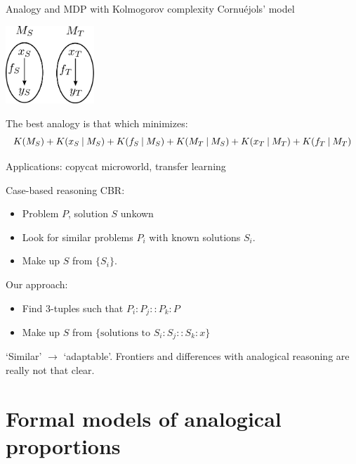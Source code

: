 \documentclass{beamer}
\begin{document}
\begin{frame}{Analogy and MDP with Kolmogorov complexity}
  Cornuéjols' model \cite{CorJFA96}
  \begin{center}
  \includegraphics[width=0.25\textwidth]{figures/cornuejols_model.pdf}
  \end{center}
  The best analogy is that which minimizes:
  $$K(M_S) + K(x_S \:\vert\: M_S) + K(f_S \:\vert\: M_S) + K(M_T \:\vert\: M_S) + K(x_T
  \:\vert\: M_T) + K(f_T \:\vert\: M_T)$$

  Applications: copycat microworld, transfer learning \cite{CorMur16}
\end{frame}

\begin{frame}{Case-based reasoning}
  CBR:
\begin{itemize}
  \item Problem $P$, solution $S$ unkown
  \item Look for similar problems $P_i$ with known solutions $S_i$.
  \item Make up $S$ from $\{S_i\}$.
\end{itemize}

Our approach:
\begin{itemize}
  \item Find $3$-tuples such that $P_i: P_j :: P_k : P$
  \item Make up $S$ from $\{ \text{solutions to } S_i: S_j :: S_k : x\}$
\end{itemize}
  `Similar' $\rightarrow$ `\alert{adaptable}'. Frontiers and differences with
  analogical reasoning are really not that clear.
\end{frame}

\section[Analogical proportions]{Formal models of analogical proportions}
\end{document}

